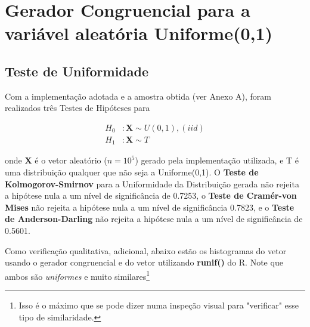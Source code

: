 \documentclass[
	article,			%
	12pt,				%
	twoside,			%
	a4paper,			%
	english,			%
	brazil,				%
	]{abntex2}
\begin{document}
\section{Gerador Congruencial para a variável aleatória Uniforme(0,1)}\label{metodo:runif_cong}
\subsection{Teste de Uniformidade}
    Com a implementação adotada e a amostra obtida (ver Anexo A), foram realizados três Testes de Hipóteses para 
        
    \begin{align*}
        H_0 & : \mathbf{X} \sim U(0,1), (iid) \\
        H_1 & : \mathbf{X} \sim T
    \end{align*}
    
    onde \textbf{X} é o vetor aleatório  ($n = 10^5$) gerado pela implementação utilizada, e T é uma distribuição qualquer que não seja a Uniforme(0,1). O \textbf{Teste de Kolmogorov-Smirnov} para a Uniformidade da Distribuição gerada não rejeita a hipótese nula a um nível de significância de 0.7253, o \textbf{Teste de Cramér-von Mises} não rejeita a hipótese nula a um nível de significância 0.7823, e o \textbf{Teste de Anderson-Darling} não rejeita a hipótese nula a um nível de significância de 0.5601. 
    
    Como verificação qualitativa, adicional, abaixo estão os histogramas do vetor usando o gerador congruencial e do vetor utilizando \textbf{runif()} do R. Note que ambos são \textit{uniformes} e muito similares\footnote{Isso é o máximo que se pode dizer numa inspeção visual para "verificar" esse tipo de similaridade.}
\end{document}
